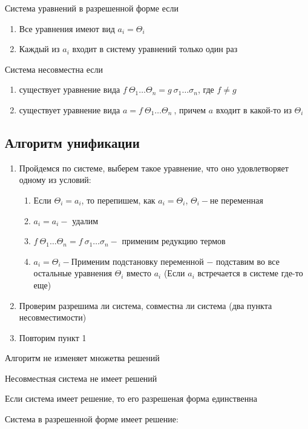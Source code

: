 		\begin{definition}Система уравнений в разрешенной форме если \end{definition}
			\begin{enumerate}
				\item Все уравнения имеют вид $a_i=\Theta_i$
				\item Каждый из $a_i$ входит в систему уравнений только один раз
			\end{enumerate}
		\begin{definition}Система несовместна если\end{definition} 
		\begin{enumerate}
			\item существует уравнение вида $f\:\Theta_1\hdots\Theta_n=g\:\sigma_1\hdots\sigma_n$, где $f\neq g$
			\item существует уравнение вида $a=f\:\Theta_1\hdots\Theta_n\:$, причем $a$ входит в какой-то из $\Theta_i$
		\end{enumerate}			

    \subsection{ Алгоритм унификации}
		\begin{enumerate}
		\item Пройдемся по системе, выберем такое уравнение, что оно удовлетворяет одному из условий:\begin{enumerate}
			\item Если $\Theta_i=a_i$, то перепишем, как $a_i=\Theta_i$, $\Theta_i-$не переменная
			\item $a_i=a_i-$ удалим
			\item $f\:\Theta_1\hdots\Theta_n=f\:\sigma_1\hdots\sigma_n-$  применим редукцию термов 
			\item $a_i=\Theta_i-$Применим подстановку переменной $-$ подставим во все остальные уравнения $\Theta_i$ вместо $a_i$ (Если $a_i$ встречается в системе где-то еще)
		\end{enumerate}
		\item Проверим разрешима ли система, совместна ли система (два пункта несовместимости)
		\item Повторим пункт 1 		
		\end{enumerate}

		\begin{statement} Алгоритм не изменяет множетва решений\end{statement}
		\begin{statement} Несовместная система не имеет решений\end{statement}
		\begin{statement} Если система имеет решение, то его разрешеная форма единственна\end{statement}
		\begin{statement} Система в разрешенной форме имеет решение:\end{statement}	
		
